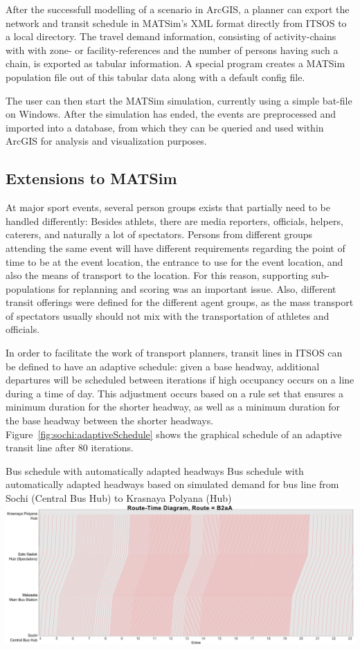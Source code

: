 After the successfull modelling of a scenario in ArcGIS, a planner can export
the network and transit schedule in MATSim's XML format directly from ITSOS to a
local directory. The travel demand information, consisting of activity-chains
with with zone- or facility-references and the number of persons having such a
chain, is exported as tabular information. A special program creates a MATSim
population file out of this tabular data along with a default config file.

The user can then start the MATSim simulation, currently using a simple bat-file
on Windows. After the simulation has ended, the events are preprocessed and
imported into a database, from which they can be queried and used within ArcGIS
for analysis and visualization purposes.


\subsection{Extensions to MATSim}

At major sport events, several person groups exists that partially need to be
handled differently: Besides athlets, there are media reporters, officials,
helpers, caterers, and naturally a lot of spectators. Persons from different
groups attending the same event will have different requirements regarding the
point of time to be at the event location, the entrance to use for the event
location, and also the means of transport to the location.  For this reason,
supporting sub-populations for replanning and scoring was an important issue.
Also, different transit offerings were defined for the different agent groups,
as the mass transport of spectators usually should not mix with the
transportation of athletes and officials.


In order to facilitate the work of transport planners, transit lines in
ITSOS can be defined to have an adaptive schedule: given a base headway,
additional departures will be scheduled between iterations if high
occupancy occurs on a line during a time of day. This adjustment occurs based
on a rule set that ensures a minimum duration for the shorter headway, as well
as a minimum duration for the base headway between the shorter headways.
Figure~\ref{fig:sochi:adaptiveSchedule} shows the graphical schedule of an
adaptive transit line after 80 iterations.

\createfigure%
{Bus schedule with automatically adapted headways}%
{Bus schedule with automatically adapted headways based on simulated demand for
bus line from Sochi (Central Bus Hub) to Krasnaya Polyana (Hub)}%
{\label{fig:sochi:adaptiveSchedule}}%
{\includegraphics[width=1.\textwidth,angle=0]{./using/figures/sochi_adaptiveSchedule.pdf}}%
{}

